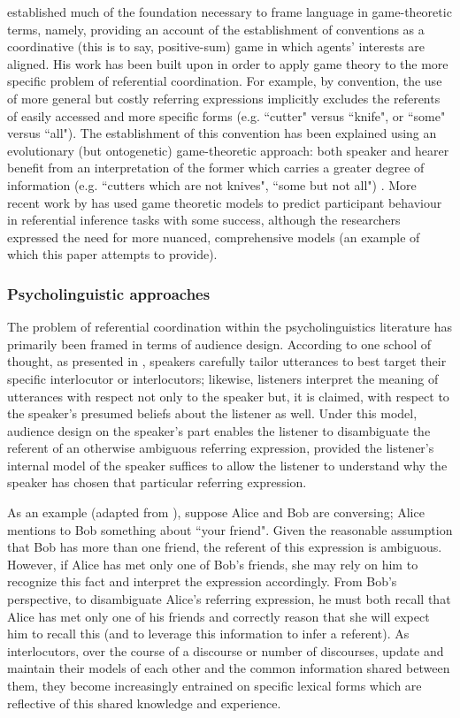 \documentclass[12pt,a4paper]{article}
\begin{document}
\cite{lewis1969} established much of the foundation necessary to frame language in game-theoretic terms, namely, providing an account of the establishment of conventions as a coordinative (this is to say, positive-sum) game in which agents' interests are aligned. His work has been built upon in order to apply game theory to the more specific problem of referential coordination. For example, by convention, the use of more general but costly referring expressions implicitly excludes the referents of easily accessed and more specific forms (e.g. ``cutter" versus ``knife", or ``some" versus ``all"). The establishment of this convention has been explained using an evolutionary (but ontogenetic) game-theoretic approach: both speaker and hearer benefit from an interpretation of the former which carries a greater degree of information (e.g. ``cutters which are not knives", ``some but not all") \citep{benz2005}. More recent work by \cite{degen2012} has used game theoretic models to predict participant behaviour in referential inference tasks with some success, although the researchers expressed the need for more nuanced, comprehensive models (an example of which this paper attempts to provide). 

\subsubsection{Psycholinguistic approaches}
The problem of referential coordination within the psycholinguistics literature has primarily been framed in terms of audience design. According to one school of thought, as presented in \cite{clark1982}, speakers carefully tailor utterances to best target their specific interlocutor or interlocutors; likewise, listeners interpret the meaning of utterances with respect not only to the speaker but, it is claimed, with respect to the speaker's presumed beliefs about the listener as well. Under this model, audience design on the speaker's part enables the listener to disambiguate the referent of an otherwise ambiguous referring expression, provided the listener's internal model of the speaker suffices to allow the listener to understand why the speaker has chosen that particular referring expression. 

As an example (adapted from \citeauthor{clark1982}), suppose Alice and Bob are conversing; Alice mentions to Bob something about ``your friend". Given the reasonable assumption that Bob has more than one friend, the referent of this expression is ambiguous. However, if Alice has met only one of Bob's friends, she may rely on him to recognize this fact and interpret the expression accordingly. From Bob's perspective, to disambiguate Alice's referring expression, he must both recall that Alice has met only one of his friends and  correctly reason that she will expect him to recall this (and to leverage this information to infer a referent). As interlocutors, over the course of a discourse or number of discourses, update and maintain their models of each other and the common information shared between them, they become increasingly entrained on specific lexical forms which are reflective of this shared knowledge and experience.
\end{document}
